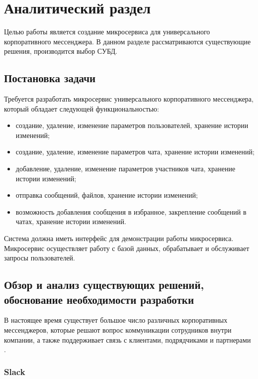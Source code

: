 \chapter{\textbf{Аналитический раздел}}
\hfill

Целью работы является создание микросервиса для универсального корпоративного мессенджера. В данном разделе рассматриваются существующие решения, производится выбор СУБД. 

\section{\textbf{Постановка задачи}}

Требуется разработать микросервис универсального корпоративного мессенджера, который обладает следующей функциональностью:
\begin{itemize}
\item создание, удаление, изменение параметров пользователей, хранение истории изменений;
\item создание, удаление, изменение параметров чата, хранение истории изменений;
\item добавление, удаление, изменение параметров участников чата, хранение истории изменений;
\item отправка сообщений, файлов, хранение истории изменений;
\item возможность добавления сообщения в избранное, закрепление сообщений в чатах, хранение истории изменений. 
\end{itemize}

Система должна иметь интерфейс для демонстрации работы микросервиса. Микросервис осуществляет работу с базой данных, обрабатывает и обслуживает запросы пользователей. 

\section{\textbf{Обзор и анализ существующих решений, обоснование необходимости разработки}}

В настоящее время существует большое число различных корпоративных мессенджеров, которые решают вопрос коммуникации сотрудников внутри компании, а также поддерживает связь с клиентами, подрядчиками и партнерами  \cite{comandmessenger}.

\subsection{\textbf{Slack}}

